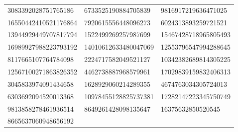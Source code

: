 \begin{longtable}{*{3}{l}}
3083392028751765186&6733525190884705839&9816917219636471025\\
16550442410521176864&7920615556448096273&6024313893259721521\\
13944929449707817794&1522499269257987699&15467428718965805493\\
16989927988223793192&14010612633480047069&12553796547994288645\\
8117665107764784098&2224717582049521127&10342382689814305225\\
12567100271863826352&4462738887968579961&17029839159832406313\\
3045833974091434658&1628929060214289355&4674763034305724013\\
6303692094520013368&10978455128825737381&17282147223345750749\\
9813858278461936514&8649261428098135647&16375632850520545\\
8665637060948656192&\\
\bottomrule\end{longtable}

